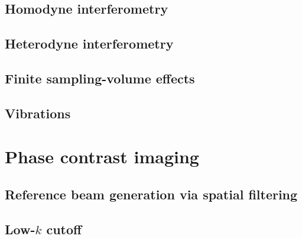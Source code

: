 \subsection{Homodyne interferometry}
\subsection{Heterodyne interferometry}
\subsection{Finite sampling-volume effects}
\subsection{Vibrations}


\section{Phase contrast imaging}
\subsection{Reference beam generation via spatial filtering}
\subsection{Low-$k$ cutoff}





